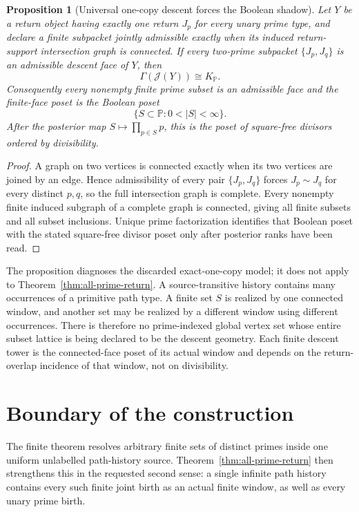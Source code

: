 \documentclass[11pt]{article}
\newtheorem{proposition}[theorem]{Proposition}
\begin{document}
\begin{proposition}[Universal one-copy descent forces the Boolean shadow]
\label{prop:global-boolean-tradeoff}
Let \(Y\) be a return object having exactly one return \(J_p\) for every unary
prime type, and declare a finite subpacket jointly admissible exactly when its
induced return-support intersection graph is connected.  If every two-prime
subpacket \(\{J_p,J_q\}\) is an admissible descent face of \(Y\), then
\[
\Gamma(\mathcal J(Y))\cong K_{\mathbb P}.
\]
Consequently every nonempty finite prime subset is an admissible face and the
finite-face poset is the Boolean poset
\[
\{S\subset\mathbb P:0<|S|<\infty\}.
\]
After the posterior map \(S\mapsto\prod_{p\in S}p\), this is the poset of
square-free divisors ordered by divisibility.
\end{proposition}

\begin{proof}
A graph on two vertices is connected exactly when its two vertices are joined
by an edge.  Hence admissibility of every pair \(\{J_p,J_q\}\) forces
\(J_p\sim J_q\) for every distinct \(p,q\), so the full intersection graph is
complete.  Every nonempty finite induced subgraph of a complete graph is
connected, giving all finite subsets and all subset inclusions.  Unique prime
factorization identifies that Boolean poset with the stated square-free
divisor poset only after posterior ranks have been read.
\end{proof}

The proposition diagnoses the discarded exact-one-copy model; it does not
apply to Theorem~\ref{thm:all-prime-return}.  A source-transitive history
contains many occurrences of a primitive path type.  A finite set \(S\) is
realized by one connected window, and another set may be realized by a
different window using different occurrences.  There is therefore no
prime-indexed global vertex set whose entire subset lattice is being declared
to be the descent geometry.  Each finite descent tower is the connected-face
poset of its actual window and depends on the return-overlap incidence of that
window, not on divisibility.

\section{Boundary of the construction}

The finite theorem resolves arbitrary finite sets of distinct primes inside
one uniform unlabelled path-history source.  Theorem~\ref{thm:all-prime-return}
then strengthens this in the requested second sense: a single infinite path
history contains every such finite joint birth as an actual finite window,
as well as every unary prime birth.
\end{document}
